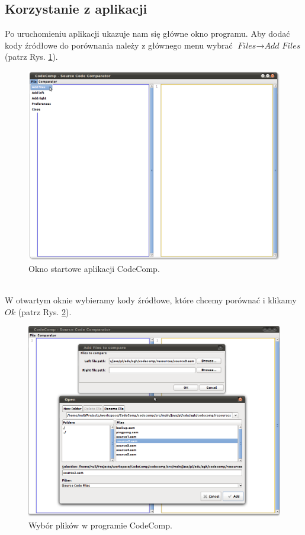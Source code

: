 \documentclass[a4paper,12pt]{article}
\begin{document}
\newpage

\subsection{Korzystanie z aplikacji}

Po uruchomieniu aplikacji ukazuje nam się główne okno programu. Aby dodać kody źródłowe do porównania należy z głównego menu wybrać $\textit{Files} \rightarrow \textit{Add Files}$ (patrz Rys. \ref{fig:addfile}).
\begin{figure}[here]
\centering
\includegraphics[scale=0.25]{gfx/add_files.png}
\caption{Okno startowe aplikacji CodeComp.}
\label{fig:addfile}
\end{figure}
\\
W otwartym oknie wybieramy kody źródłowe, które chcemy porównać i klikamy $\textit{Ok}$ (patrz Rys. \ref{fig:ok}).
\begin{figure}[!]
\centering
\includegraphics[scale=0.25]{gfx/select_files.png}
\caption{Wybór plików w programie CodeComp.}
\label{fig:ok}
\end{figure}
\end{document}
